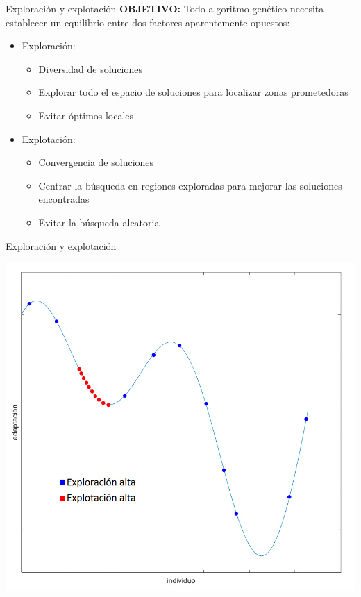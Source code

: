 \documentclass[10pt]{beamer}
\begin{document}
\begin{frame}{Exploración y explotación}
		\textbf{OBJETIVO:} Todo algoritmo genético necesita establecer un equilibrio entre dos factores aparentemente opuestos:
	\begin{itemize}

		\item Exploración:
			\begin{itemize}
				 \item Diversidad de soluciones
				 \item Explorar todo el espacio de soluciones para localizar zonas prometedoras
				 \item Evitar óptimos locales
			\end{itemize}
		\item Explotación:
			\begin{itemize}
				\item Convergencia de soluciones
				\item Centrar la búsqueda en regiones exploradas para mejorar las soluciones encontradas
				\item Evitar la búsqueda aleatoria 
			\end{itemize}
	\end{itemize}

\end{frame}

\begin{frame}{Exploración y explotación}
	\begin{center}
		\includegraphics[width=\textwidth,height=0.8\textheight,keepaspectratio]{exploracion_explotacion}
	\end{center}
\end{frame}
\end{document}
